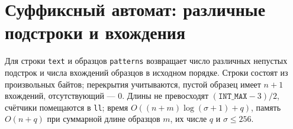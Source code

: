 %

\section{Суффиксный автомат: различные подстроки и вхождения}
Для строки \texttt{text} и образцов \texttt{patterns} возвращает число различных непустых подстрок и числа вхождений образцов в исходном порядке.
Строки состоят из произвольных байтов; перекрытия учитываются, пустой образец имеет $n+1$ вхождений, отсутствующий --- 0.
Длины не превосходят $(\texttt{INT\_MAX}-3)/2$, счётчики помещаются в \texttt{ll}; время $O((n+m)\log(\sigma+1)+q)$, память $O(n+q)$ при суммарной длине образцов $m$, их числе $q$ и $\sigma\le256$.
